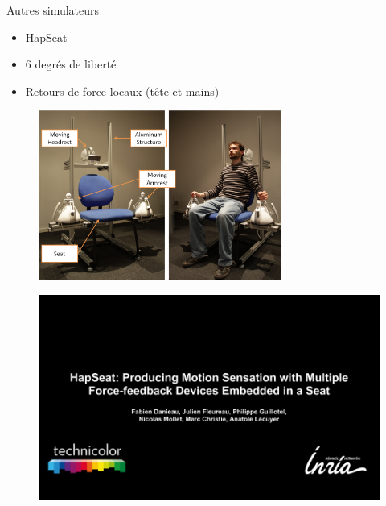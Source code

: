 \documentclass[compress, noflama]{beamer}
\begin{document}
{
\begin{frame}{Autres simulateurs}
\begin{itemize}
\item HapSeat
\item 6 degrés de liberté
\item Retours de force locaux (tête et mains)
\end{itemize}
\begin{figure}
\centering
\includegraphics[width=8cm]{images/prototype}
\end{figure}
\end{frame}

\begin{frame}
\begin{figure}
\href{run:videos/HapSeat.avi}{\includegraphics[width=\linewidth]{images/hapseat}}
\end{figure}

\end{frame}
}
\end{document}

